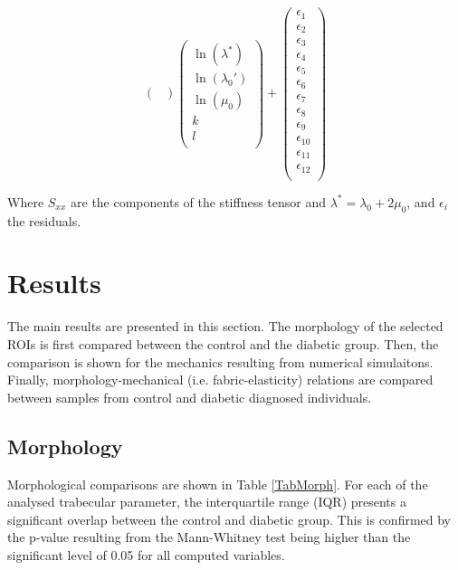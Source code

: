 \documentclass[a4paper,fleqn]{DC_ArtStyle}
\begin{document}
\begin{equation}
\begin{pmatrix}
		\end{pmatrix} \begin{pmatrix}
		\ln(\lambda^{*}) \\
		\ln(\lambda_0') \\
		\ln(\mu_0) \\
		k \\
		l \\
		\end{pmatrix} + \begin{pmatrix}
		\epsilon_{1} \\
		\epsilon_{2} \\
		\epsilon_{3} \\
		\epsilon_{4} \\
		\epsilon_{5} \\
		\epsilon_{6} \\
		\epsilon_{7} \\
		\epsilon_{8} \\
		\epsilon_{9} \\
		\epsilon_{10} \\
		\epsilon_{11} \\
		\epsilon_{12} \\
		\end{pmatrix}
		\label{EqFit}
	\end{equation}
		
	Where $S_{xx}$ are the components of the stiffness tensor and $\lambda^{*} = \lambda_0 + 2\mu_0$, and $\epsilon_i$ the residuals.



	\section{Results}
	The main results are presented in this section.
	The morphology of the selected ROIs is first compared between the control and the diabetic group.
	Then, the comparison is shown for the mechanics resulting from numerical simulaitons.
	Finally, morphology-mechanical (i.e. fabric-elasticity) relations are compared between samples from control and diabetic diagnosed individuals.

	\subsection{Morphology}
	Morphological comparisons are shown in Table \ref{TabMorph}.
	For each of the analysed trabecular parameter, the interquartile range (IQR) presents a significant overlap between the control and diabetic group.
	This is confirmed by the p-value resulting from the Mann-Whitney test being higher than the significant level of 0.05 for all computed variables.
\end{document}

